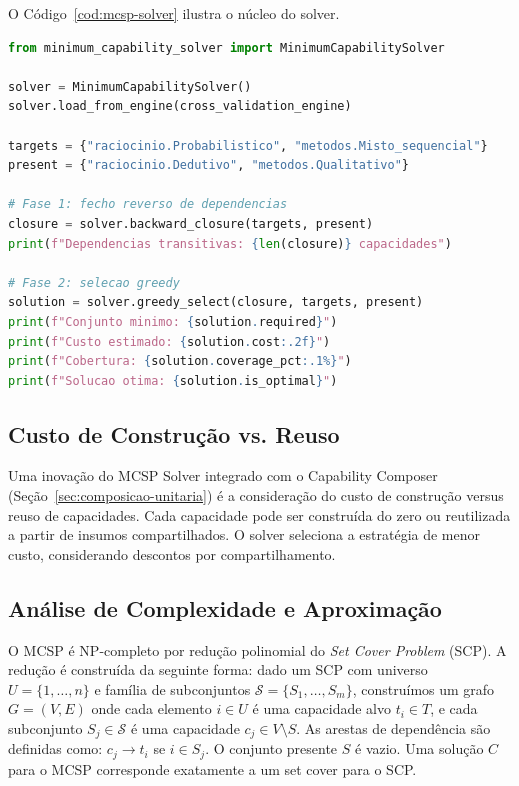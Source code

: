 O Código~\ref{cod:mcsp-solver} ilustra o núcleo do solver.

\begin{lstlisting}[caption={Algoritmo do MCSP Solver: backward closure
e greedy selection.},
label={cod:mcsp-solver}, style=pythonstyle, language=Python]
from minimum_capability_solver import MinimumCapabilitySolver

solver = MinimumCapabilitySolver()
solver.load_from_engine(cross_validation_engine)

targets = {"raciocinio.Probabilistico", "metodos.Misto_sequencial"}
present = {"raciocinio.Dedutivo", "metodos.Qualitativo"}

# Fase 1: fecho reverso de dependencias
closure = solver.backward_closure(targets, present)
print(f"Dependencias transitivas: {len(closure)} capacidades")

# Fase 2: selecao greedy
solution = solver.greedy_select(closure, targets, present)
print(f"Conjunto minimo: {solution.required}")
print(f"Custo estimado: {solution.cost:.2f}")
print(f"Cobertura: {solution.coverage_pct:.1%}")
print(f"Solucao otima: {solution.is_optimal}")
\end{lstlisting}

\subsection{Custo de Construção vs. Reuso}

Uma inovação do MCSP Solver integrado com o Capability Composer
(Seção~\ref{sec:composicao-unitaria}) é a consideração do custo de
construção versus reuso de capacidades. Cada capacidade pode ser construída
do zero ou reutilizada a partir de insumos compartilhados. O solver
seleciona a estratégia de menor custo, considerando descontos por
compartilhamento.

\subsection{Análise de Complexidade e Aproximação}

O MCSP é NP-completo por redução polinomial do \emph{Set Cover Problem}
(SCP). A redução é construída da seguinte forma: dado um SCP com
universo $U = \{1, \dots, n\}$ e família de subconjuntos
$\mathcal{S} = \{S_1, \dots, S_m\}$, construímos um grafo $G = (V, E)$
onde cada elemento $i \in U$ é uma capacidade alvo $t_i \in T$, e cada
subconjunto $S_j \in \mathcal{S}$ é uma capacidade $c_j \in V \setminus S$.
As arestas de dependência são definidas como: $c_j \rightarrow t_i$ se
$i \in S_j$. O conjunto presente $S$ é vazio. Uma solução $C$ para o
MCSP corresponde exatamente a um set cover para o SCP.

